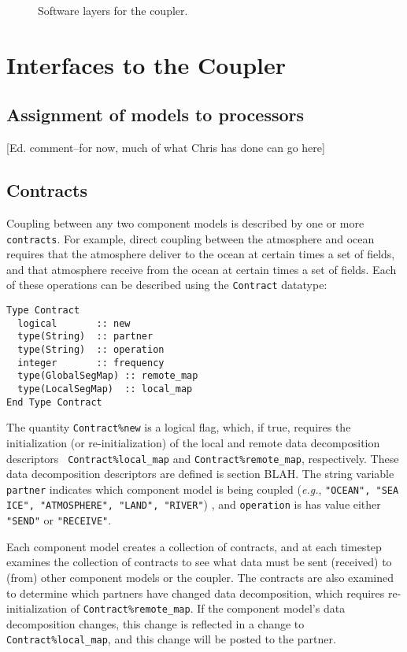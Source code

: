 \documentclass{article}
\begin{document}
\begin{figure}
\epsfxsize=6.0in
\centerline{ }
\caption{Software layers for the coupler.}
\label{fig:coupler-layers}
\end{figure}

\section{Interfaces to the Coupler}

\subsection{Assignment of models to processors}

[Ed. comment--for now, much of what Chris has done can go here]

\subsection{Contracts}

Coupling between any two component models is described by one or
more {\tt contracts}.  For example, direct coupling between the
atmosphere and ocean requires that the atmosphere deliver to the
ocean at certain times a set of fields, and that atmosphere
receive from the ocean at certain times a set of fields.  Each of
these operations can be described using the {\tt Contract}
datatype:

\begin{verbatim}
Type Contract
  logical       :: new
  type(String)  :: partner
  type(String)  :: operation
  integer       :: frequency
  type(GlobalSegMap) :: remote_map
  type(LocalSegMap)  :: local_map
End Type Contract
\end{verbatim}

The quantity {\tt Contract\%new} is a logical flag, which, if
true, requires the initialization (or re-initialization) of the
local and remote data decomposition descriptors {\tt
Contract\%local\_map} and {\tt Contract\%remote\_map},
respectively. These data decomposition descriptors are defined is
section BLAH.  The string variable {\tt partner} indicates which
component model is being coupled ({\em e.g.}, {\tt "OCEAN", "SEA
ICE", "ATMOSPHERE", "LAND", "RIVER"}) , and {\tt operation} is
has value either {\tt "SEND"} or {\tt "RECEIVE"}.

Each component model creates a collection of contracts, and at
each timestep examines the collection of contracts to see what
data must be sent (received) to (from) other component models or
the coupler.  The contracts are also examined to determine which
partners have changed data decomposition, which requires
re-initialization of {\tt Contract\%remote\_map}.  If the
component model's data decomposition changes, this change is
reflected in a change to {\tt Contract\%local\_map}, and this
change will be posted to the partner.
\end{document}
